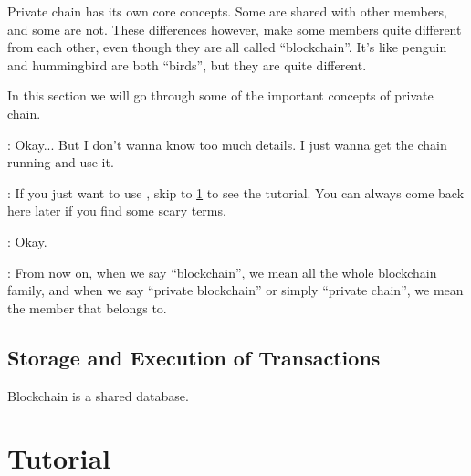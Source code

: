 \documentclass[dvipsnames]{article}
\newcommand{\Wch}{\strong{\cola{Weak Chain}}}
\begin{document}
Private chain has its own core concepts. Some are shared with other members, and
some are not. These differences however, make some members quite different from
each other, even though they are all called ``blockchain''. It's like penguin
and hummingbird are both ``birds'', but they are quite different.

In this section we will go through some of the important concepts of
private chain. 

 : Okay... But I don't wanna know too much details. I just wanna
get the chain running and use it.

 : If you just want to use \Wch{}, skip to \cref{sec:tut} to see
the tutorial. You can always come back here later if you find some scary terms.

 : Okay.

\begin{weakBox}[title=Some terms]
   : From now on, when we say ``blockchain'', we mean all the
  whole blockchain family, and when we say ``private blockchain'' or simply
  ``private chain'', we mean the member that \Wch{} belongs to.
\end{weakBox}

\subsection{Storage and Execution of Transactions}
Blockchain is a shared database.


\section{Tutorial}
\label{sec:tut}
\end{document}
